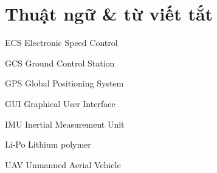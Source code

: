 \newcommand{\abbrlabel}[1]{\makebox[3cm][l]{\textbf{#1}\ \dotfill}}
\newenvironment{abbreviations}{\begin{list}{}{\renewcommand{\makelabel}{\abbrlabel}}}{\end{list}}

\chapter*{Thuật ngữ \& từ viết tắt}
\thispagestyle{empty}
\pagestyle{empty}
\vspace{1.0cm}
\begin{abbreviations}
	\item[ECS] Electronic Speed Control
	\item[GCS] Ground Control Station
	\item[GPS] Global Positioning System
	\item[GUI] Graphical User Interface
	\item[IMU] Inertial Measurement Unit
	\item[Li-Po]  Lithium polymer
	\item[UAV] Unmanned Aerial Vehicle
\end{abbreviations}